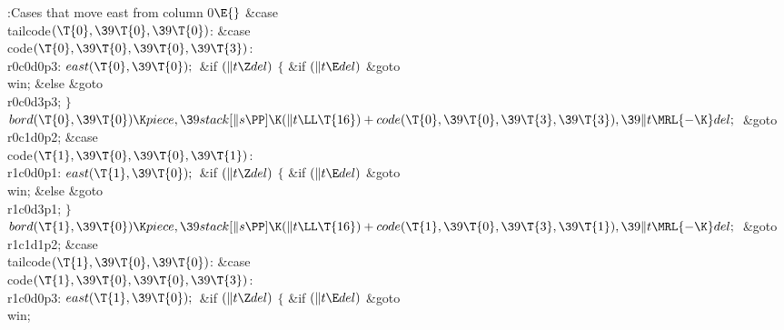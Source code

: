 \B{}:Cases that move east from column 0\X${}\E{}$%
\6
\4\&{case} \\{tailcode}${}(\T{0},\39\T{0},\39\T{0}){}$:\5
\&{case} \\{code}${}(\T{0},\39\T{0},\39\T{0},\39\T{3}){}$:\5
\\{r0c0d0p3}:\5
${}\\{east}(\T{0},\39\T{0});{}$\6
\&{if} ${}(\|t\Z\\{del}){}$\5
${}\{{}$\5
\1\&{if} ${}(\|t\E\\{del}){}$\1\5
\&{goto} \\{win};\5
\2\&{else}\1\5
\&{goto} \\{r0c0d3p3};\5
\2${}\}{}$\2\6
${}\\{bord}(\T{0},\39\T{0})\K\\{piece},\39\\{stack}[\|s\PP]\K(\|t\LL\T{16})+%
\\{code}(\T{0},\39\T{0},\39\T{3},\39\T{3}),\39\|t\MRL{-{\K}}\\{del};{}$\6
\&{goto} \\{r0c1d0p2};\6
\4\&{case} \\{code}${}(\T{1},\39\T{0},\39\T{0},\39\T{1}){}$:\5
\\{r1c0d0p1}:\5
${}\\{east}(\T{1},\39\T{0});{}$\6
\&{if} ${}(\|t\Z\\{del}){}$\5
${}\{{}$\5
\1\&{if} ${}(\|t\E\\{del}){}$\1\5
\&{goto} \\{win};\5
\2\&{else}\1\5
\&{goto} \\{r1c0d3p1};\5
\2${}\}{}$\2\6
${}\\{bord}(\T{1},\39\T{0})\K\\{piece},\39\\{stack}[\|s\PP]\K(\|t\LL\T{16})+%
\\{code}(\T{1},\39\T{0},\39\T{3},\39\T{1}),\39\|t\MRL{-{\K}}\\{del};{}$\6
\&{goto} \\{r1c1d1p2};\6
\4\&{case} \\{tailcode}${}(\T{1},\39\T{0},\39\T{0}){}$:\5
\&{case} \\{code}${}(\T{1},\39\T{0},\39\T{0},\39\T{3}){}$:\5
\\{r1c0d0p3}:\5
${}\\{east}(\T{1},\39\T{0});{}$\6
\&{if} ${}(\|t\Z\\{del}){}$\5
${}\{{}$\5
\1\&{if} ${}(\|t\E\\{del}){}$\1\5
\&{goto} \\{win};\5
